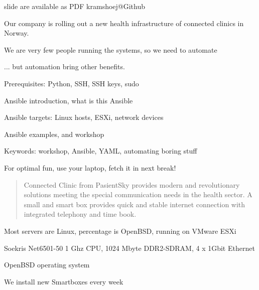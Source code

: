 \documentclass[18pt,landscape,a4paper,footrule]{foils}
\begin{document}


\vskip 1cm
\centerline{\footnotesize slide are available as PDF kramshoej@Github}


Our company is rolling out a new health infrastructure of connected clinics in Norway.

We are very few people running the systems, so we need to automate

... but automation bring other benefits.

\begin{list1}
\item Prerequisites: Python, SSH, SSH keys, sudo
\item Ansible introduction, what is this Ansible
\item Ansible targets: Linux hosts, ESXi, network devices
\item Ansible examples, and workshop
\item Keywords: workshop, Ansible, YAML, automating boring stuff
\end{list1}

\centerline{For optimal fun, use your laptop, fetch it in next break!}




\begin{quote}
Connected Clinic from PasientSky provides modern and revolutionary solutions meeting the special communication needs in the health sector. A small and smart box provides quick and stable internet connection with integrated telephony and time book.
\end{quote}



Most servers are Linux, percentage is OpenBSD, running on VMware ESXi



\begin{list2}
\item Soekris Net6501-50 1 Ghz CPU, 1024 Mbyte DDR2-SDRAM, 4 x 1Gbit Ethernet
\item OpenBSD operating system
\item We install new Smartboxes every week
\end{list2}
\end{document}
